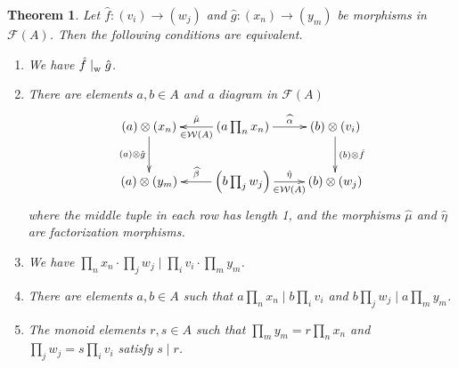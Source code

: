\documentclass[reqno]{amsart}
\theoremstyle{plain}
\newtheorem{thm}[lem]{Theorem}
\theoremstyle{definition}
\newcommand{\cat}[1]{\mathcal{#1}}
\newcommand{\catw}{\cat{W}}
\newcommand{\catf}{\cat{F}}
\numberwithin{equation}{lem}
\newcommand{\divs}{\mid_{\text w}^{}}
\begin{document}
\begin{thm}\label{prop170708a}
Let
$\hat f\colon (v_i)\to(w_j)$ and $\hat g\colon (x_n)\to(y_m)$ 
be morphisms in $\catf(A)$. Then the following conditions are equivalent.
\begin{enumerate}[\rm(i)]
\item \label{prop170708a1}
We have $\hat f\divs\hat g$.
\item \label{prop170708a2'}
There are elements $a,b\in A$  and a diagram
in $\catf(A)$
\begin{equation*}
\xymatrix{
(a)\otimes(x_n)\ar[d]_-{(a)\otimes\hat g}
&\ar[l]_-{\hat{\mu}}^-{\in\catw(A)}\left(a\prod_nx_n\right)\ar[r]^-{\widehat{\alpha}}
&(b)\otimes(v_i)\ar[d]^-{(b)\otimes\hat f}
\\
(a)\otimes(y_m)
&\ar[l]_-{\widehat{\beta}}\left(b\prod_jw_j\right)\ar[r]^-{\hat{\eta}}_-{\in\catw(A)}
&(b)\otimes(w_j)
}
\end{equation*}
where the middle tuple in each row has length 1, and the morphisms $\hat\mu$ and $\hat\eta$ are 
factorization morphisms.
\item \label{prop170708a4}
We have $\prod_nx_n\cdot\prod_jw_j\mid\prod_iv_i\cdot\prod_my_m$.
\item \label{prop170708a3}
There are elements $a,b\in A$ such that $a\prod_nx_n\mid b\prod_iv_i$ and $b\prod_jw_j\mid a\prod_my_m$.
\item \label{prop170708a5}
The monoid elements $r,s\in A$ such that $\prod_my_m=r\prod_nx_n$ and $\prod_jw_j=s\prod_iv_i$ satisfy $s\mid r$.
\end{enumerate}
\end{thm}
\end{document}

